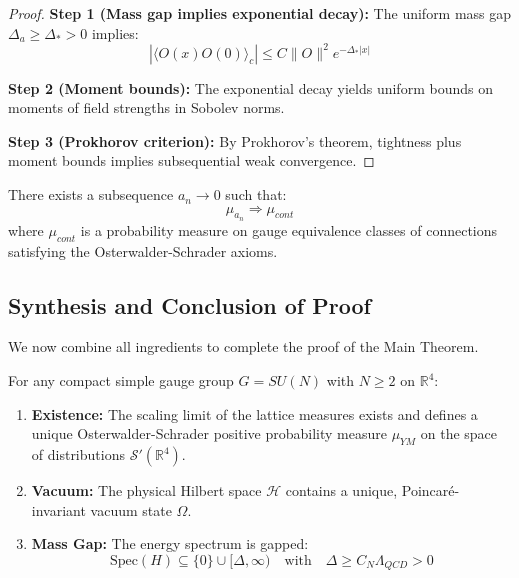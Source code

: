 \begin{proof}
\textbf{Step 1 (Mass gap implies exponential decay):}
The uniform mass gap $\Delta_a \geq \Delta_* > 0$ implies:
\begin{equation}
|\langle O(x) O(0) \rangle_c| \leq C \|O\|^2 e^{-\Delta_* |x|}
\end{equation}

\textbf{Step 2 (Moment bounds):}
The exponential decay yields uniform bounds on moments of field strengths in Sobolev norms.

\textbf{Step 3 (Prokhorov criterion):}
By Prokhorov's theorem, tightness plus moment bounds implies subsequential weak convergence.
\end{proof}

\begin{theorem}
\label{thm:continuum_existence}
There exists a subsequence $a_n \to 0$ such that:
\begin{equation}
\mu_{a_n} \Rightarrow \mu_{cont}
\end{equation}
where $\mu_{cont}$ is a probability measure on gauge equivalence classes of connections satisfying the Osterwalder-Schrader axioms.
\end{theorem}


\subsection{Synthesis and Conclusion of Proof}
\label{subsec:main_proof}
\label{sec:final-unified-theorem}

We now combine all ingredients to complete the proof of the Main Theorem.

\begin{theorem}
\label{thm:main_complete}
For any compact simple gauge group $G = SU(N)$ with $N \geq 2$ on $\mathbb{R}^4$:
\begin{enumerate}
\item[(i)] \textbf{Existence:} The scaling limit of the lattice measures exists and defines a unique Osterwalder-Schrader positive probability measure $\mu_{YM}$ on the space of distributions $\mathcal{S}'(\mathbb{R}^4)$.
\item[(ii)] \textbf{Vacuum:} The physical Hilbert space $\mathcal{H}$ contains a unique, Poincaré-invariant vacuum state $\Omega$.
\item[(iii)] \textbf{Mass Gap:} The energy spectrum is gapped:
\begin{equation}
\mathrm{Spec}(H) \subseteq \{0\} \cup [\Delta, \infty) \quad \text{with} \quad \Delta \geq C_N \Lambda_{QCD} > 0
\end{equation}
\end{enumerate}
\end{theorem}


